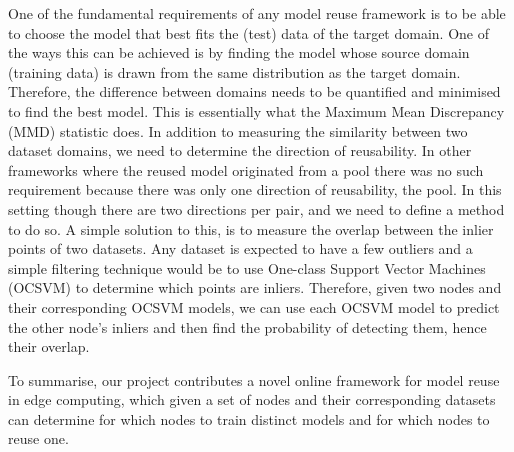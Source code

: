 \documentclass{mpaper}
\begin{document}
One of the fundamental requirements of any model reuse framework is to be able to choose the model that best fits the (test) data of the target domain. One of the ways this can be achieved is by finding the model whose source domain (training data) is drawn from the same distribution as the target domain. Therefore, the difference between domains needs to be quantified and minimised to find the best model. This is essentially what the Maximum Mean Discrepancy (MMD) \cite{OriginalMMD} statistic does. In addition to measuring the similarity between two dataset domains, we need to determine the direction of reusability. In other frameworks where the reused model originated from a pool there was no such requirement because there was only one direction of reusability, the pool. In this setting though there are two directions per pair, and we need to define a method to do so. A simple solution to this, is to measure the overlap between the inlier points of two datasets. Any dataset is expected to have a few outliers and a simple filtering technique would be to use One-class Support Vector Machines (OCSVM) \cite{OriginalOCSVM} to determine which points are inliers. Therefore, given two nodes and their corresponding OCSVM models, we can use each OCSVM model to predict the other node's inliers and then find the probability of detecting them, hence their overlap. 

To summarise, our project contributes a novel online framework for model reuse in edge computing, which given a set of nodes and their corresponding datasets can determine for which nodes to train distinct models and for which nodes to reuse one. 



\end{document}

